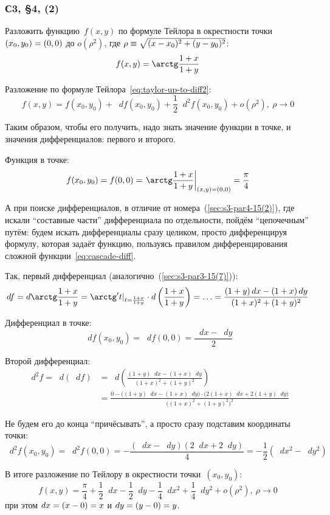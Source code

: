 \documentclass[a4paper,12pt]{article}
\newcommand{\diff}{\mathop{}\!d}
\begin{document}
  \subsubsection{С3, \S 4, (2)}

  Разложить функцию~$f(x, y)$ по формуле Тейлора в окрестности точки~$(x_0, y_0) \hm= (0, 0)$ до $o(\rho^2)$, где $\rho \hm\equiv \sqrt{(x - x_0)^2 + (y - y_0)^2}$:
  \[
    f(x, y) = \arctg \frac{1 + x}{1 + y}
  \]
  
  \begin{solution}
    Разложение по формуле Тейлора~\eqref{eq:taylor-up-to-diff2}:
    \[
      f(x, y) = f(x_0, y_0) + \diff f(x_0, y_0) + \frac{1}{2} \diff^2 f(x_0, y_0) + o(\rho^2),\ \rho \to 0
    \]

    Таким образом, чтобы его получить, надо знать значение функции в точке, и значения дифференциалов: первого и второго.

    Функция в точке:
    \[
      f(x_0, y_0) = f(0, 0) = \left.\arctg \frac{1 + x}{1 + y} \right|_{(x, y) = (0, 0)} = \frac{\pi}{4}
    \]
    
    А при поиске дифференциалов, в отличие от номера~(\ref{sec:s3-par4-15(2)}), где искали ``составные части'' дифференциала по отдельности, пойдём ``цепочечным'' путём: будем искать дифференциалы сразу целиком, просто дифференцируя формулу, которая задаёт функцию, пользуясь правилом дифференцирования сложной функции~\eqref{eq:cascade-diff}.

    Так, первый дифференциал (аналогично~(\ref{sec:s3-par3-15(7)})):
    \[
      \diff f = \diff \arctg \frac{1 + x}{1 + y}
      = \arctg't|_{t=\frac{1 + x}{1 + y}} \cdot \diff\left(\frac{1 + x}{1 + y}\right)
      = \ldots = \frac{(1 + y)\diff x - (1 + x) \diff y}{(1 + x)^2 + (1 + y)^2}
    \]

    Дифференциал в точке:
    \[
      \diff f(x_0, y_0) = \diff f(0, 0) = \frac{\diff x - \diff y}{2}
    \]

    Второй дифференциал:
    \begin{equation*}
    \begin{split}
      \diff^2 f = \diff (\diff f)
      &= \diff \left(\frac{(1 + y)\diff x - (1 + x) \diff y}{(1 + x)^2 + (1 + y)^2}\right)\\
      &= \frac{0 - \bigl((1 + y)\diff x - (1 + x) \diff y\bigr) \cdot \bigl(2(1 + x) \diff x + 2 (1 + y) \diff y\bigr)}{\bigl((1 + x)^2 + (1 + y)^2\bigr)^2}
    \end{split}
    \end{equation*}

    Не будем его до конца ``причёсывать'', а просто сразу подставим координаты точки:
    \[
      \diff^2 f(x_0, y_0) = \diff^2 f(0, 0) = -\frac{(\diff x - \diff y)(2 \diff x + 2 \diff y)}{4} = -\frac{1}{2} (\diff x^2 - \diff y^2)
    \]

    В итоге разложение по Тейлору в окрестности точки~$(x_0, y_0)$:
    \[
      f(x, y) = \frac{\pi}{4} + \frac{1}{2}\diff x - \frac{1}{2} \diff y - \frac{1}{4} \diff x^2 + \frac{1}{4} \diff y^2 + o(\rho^2),\ \rho \to 0
    \]
    при этом $\diff x \hm= (x \hm- 0) \hm= x$ и $\diff y \hm= (y \hm- 0) \hm= y$.
  \end{solution}
\end{document}
